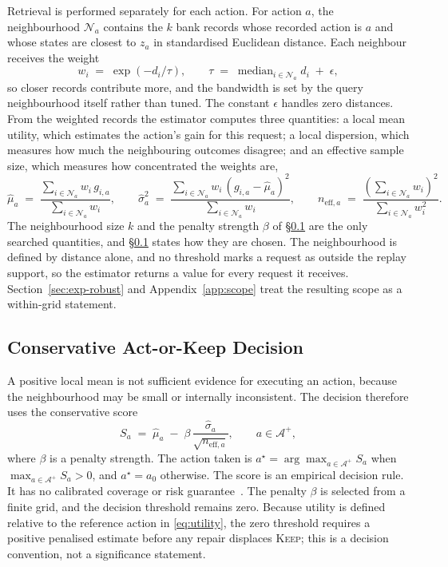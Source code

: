 \documentclass{article}
\newcommand{\calA}{\mathcal{A}}
\newcommand{\calN}{\mathcal{N}}
\begin{document}
Retrieval is performed separately for each action. For action $a$, the neighbourhood
$\calN_a$ contains the $k$ bank records whose recorded action is $a$ and whose states are
closest to $z_a$ in standardised Euclidean distance. Each neighbour receives the weight
\begin{equation}
  w_i \;=\; \exp\!\left(-d_i / \tau\right),
  \qquad
  \tau \;=\; \operatorname{median}_{i \in \calN_a} d_i \;+\; \epsilon ,
  \label{eq:weights}
\end{equation}
so closer records contribute more, and the bandwidth is set by the query neighbourhood itself
rather than tuned. The constant $\epsilon$ handles zero distances. From the weighted records
the estimator computes three quantities: a local mean utility, which estimates the action's
gain for this request; a local dispersion, which measures how much the neighbouring outcomes
disagree; and an effective sample size, which measures how concentrated the weights are,
\begin{equation}
  \hat\mu_a \;=\; \frac{\sum_{i \in \calN_a} w_i\, g_{i,a}}{\sum_{i \in \calN_a} w_i},
  \qquad
  \hat\sigma_a^{2} \;=\; \frac{\sum_{i \in \calN_a} w_i\, (g_{i,a} - \hat\mu_a)^{2}}{\sum_{i \in \calN_a} w_i},
  \qquad
  n_{\mathrm{eff},a} \;=\; \frac{\left(\sum_{i \in \calN_a} w_i\right)^{2}}{\sum_{i \in \calN_a} w_i^{2}} .
  \label{eq:local-moments}
\end{equation}
The neighbourhood size $k$ and the penalty strength $\beta$ of \S\ref{sec:method-decision} are
the only searched quantities, and \S\ref{sec:method-decision} states how they are chosen. The
neighbourhood is defined by distance alone, and no threshold marks a request as outside the
replay support, so the estimator returns a value for every request it receives.
Section~\ref{sec:exp-robust} and Appendix~\ref{app:scope} treat the resulting scope as a
within-grid statement.

\subsection{Conservative Act-or-Keep Decision}
\label{sec:method-decision}
A positive local mean is not sufficient evidence for executing an action, because the
neighbourhood may be small or internally inconsistent. The decision therefore uses the
conservative score
\begin{equation}
  S_a \;=\; \hat\mu_a \;-\; \beta\, \frac{\hat\sigma_a}{\sqrt{n_{\mathrm{eff},a}}},
  \qquad a \in \calA^{+},
  \label{eq:score}
\end{equation}
where $\beta$ is a penalty strength. The action taken is
$a^{\star} = \arg\max_{a \in \calA^{+}} S_a$ when $\max_{a \in \calA^{+}} S_a > 0$, and
$a^{\star} = a_0$ otherwise.
The score is an empirical decision rule. It has no calibrated coverage or risk
guarantee~\citep{angelopoulos2024conformal}. The penalty $\beta$ is selected from a finite
grid, and the decision threshold remains zero. Because utility is defined relative to the
reference action in \eqref{eq:utility}, the zero threshold requires a positive penalised
estimate before any repair displaces \textsc{Keep}; this is a decision convention, not a
significance statement.
\end{document}
